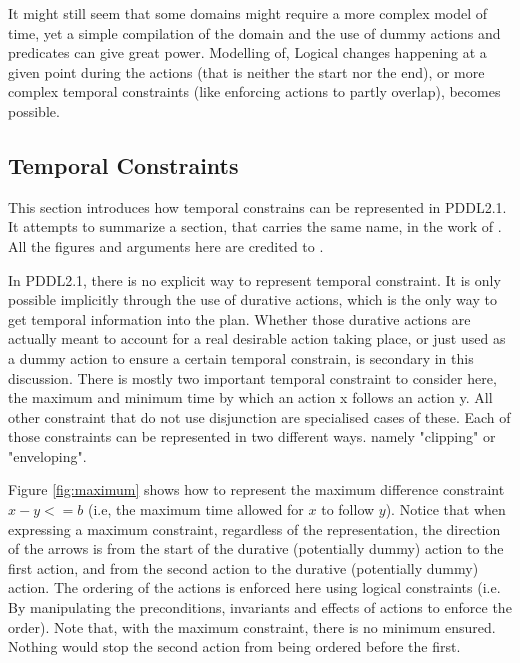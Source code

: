 \documentclass
[a4paper
,english
,parskip=half
,bibliography=totoc
]{scrreprt}
\begin{document}
    It might still seem that some domains might require a more complex model of time, yet a simple compilation of the domain and the use of dummy actions and predicates can give great power. Modelling of, Logical changes happening at a given point during the actions (that is neither the start nor the end), or more complex temporal constraints (like enforcing actions to partly overlap), becomes possible.

        \subsection{Temporal Constraints}
        This section introduces how temporal constrains can be represented in PDDL2.1. 
        It attempts to summarize a section, that carries the same name, in the work of \citet{HalseyLongFox2003}. All the figures and arguments here are credited to \citep{HalseyLongFox2003}.

        In PDDL2.1, there is no explicit way to represent temporal constraint.
        It is only possible implicitly through the use of durative actions, which is the only way to get temporal information into the plan.
        Whether those durative actions are actually meant to account for a real desirable action taking place, or just used as a dummy action to ensure a certain temporal constrain, is secondary in this discussion.
        There is mostly two important temporal constraint to consider here, the maximum and minimum time by which an action x follows an action y.
        All other constraint that do not use disjunction are specialised cases of these.
        Each of those constraints can be represented in two different ways. namely "clipping"  or "enveloping". 

        Figure \ref{fig:maximum} shows how to represent the maximum difference constraint \(x-y<=b\) (i.e, the maximum time allowed for \(x\) to follow \(y\)). Notice that when expressing a maximum constraint, regardless of the representation, the direction of the arrows is from the start of the durative (potentially dummy) action to the first action, and from the second action to the durative (potentially dummy) action. The ordering of the actions is enforced here using logical constraints (i.e. By manipulating the preconditions, invariants and effects of actions to enforce the order). Note that, with the maximum constraint, there is no minimum ensured. Nothing would stop the second action from being ordered before the first.
        
\end{document}

